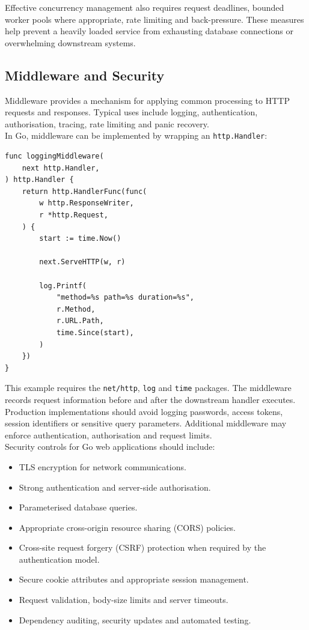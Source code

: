 Effective concurrency management also requires request deadlines, bounded worker pools where appropriate, rate limiting and back-pressure. These measures help prevent a heavily loaded service from exhausting database connections or overwhelming downstream systems.\\

\subsection{Middleware and Security}

Middleware provides a mechanism for applying common processing to HTTP requests and responses. Typical uses include logging, authentication, authorisation, tracing, rate limiting and panic recovery.\\

In Go, middleware can be implemented by wrapping an \texttt{http.Handler}:

\begin{lstlisting}
func loggingMiddleware(
    next http.Handler,
) http.Handler {
    return http.HandlerFunc(func(
        w http.ResponseWriter,
        r *http.Request,
    ) {
        start := time.Now()

        next.ServeHTTP(w, r)

        log.Printf(
            "method=%s path=%s duration=%s",
            r.Method,
            r.URL.Path,
            time.Since(start),
        )
    })
}
\end{lstlisting}

This example requires the \texttt{net/http}, \texttt{log} and \texttt{time} packages. The middleware records request information before and after the downstream handler executes.\\

Production implementations should avoid logging passwords, access tokens, session identifiers or sensitive query parameters. Additional middleware may enforce authentication, authorisation and request limits.\\

Security controls for Go web applications should include:

\begin{itemize}
    \item TLS encryption for network communications.
    \item Strong authentication and server-side authorisation.
    \item Parameterised database queries.
    \item Appropriate cross-origin resource sharing (CORS) policies.
    \item Cross-site request forgery (CSRF) protection when required by the authentication model.
    \item Secure cookie attributes and appropriate session management.
    \item Request validation, body-size limits and server timeouts.
    \item Dependency auditing, security updates and automated testing.
\end{itemize}

